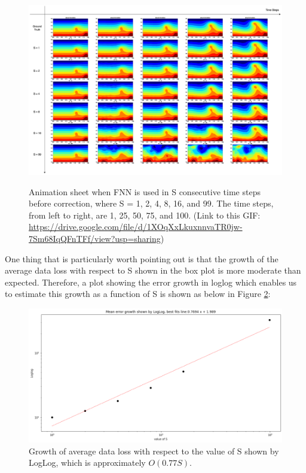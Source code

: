\begin{figure}[H]
    \centering
    \caption{Animation sheet when FNN is used in S consecutive time steps before correction, where S = 1, 2, 4, 8, 16, and 99. The time steps, from left to right, are 1, 25, 50, 75, and 100. (Link to this GIF: \url{https://drive.google.com/file/d/1XOqXxLkuxnnvaTR0jw-7Sm68IqQFnTFf/view?usp=sharing})}
    \includegraphics[scale=0.30]{figures/mantle_convection_images/further_testings/FNN_further_testing_sheet.png}
    \label{figure:further_GIF}
\end{figure}

One thing that is particularly worth pointing out is that the growth of the average data loss with respect to S shown in the box plot is more moderate than expected. Therefore, a plot showing the error growth in loglog which enables us to estimate this growth as a function of S is shown as below in Figure \ref{figure:further_loglog}:

\begin{figure}[H]
    \centering
    \includegraphics[scale=0.4]{figures/mantle_convection_images/further_testings/FNN_LogLog.png}
    \caption{Growth of average data loss with respect to the value of S shown by LogLog, which is approximately $O(0.77S)$.}
    \label{figure:further_loglog}
\end{figure}

